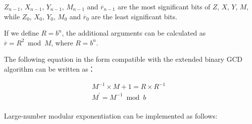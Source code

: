 \documentclass[main\_\_EN.tex]{subfiles}
\begin{document}
\begin{math}Z_{n-1}\end{math},
\begin{math}X_{n-1}\end{math},
\begin{math}Y_{n-1}\end{math},
\begin{math}M_{n-1}\end{math} and
\begin{math}\overline{r}_{n-1}\end{math} are the most significant bits of
\begin{math}Z\end{math},
\begin{math}X\end{math},
\begin{math}Y\end{math},
\begin{math}M\end{math}, while
\begin{math}Z_{0}\end{math},
\begin{math}X_{0}\end{math},
\begin{math}Y_{0}\end{math},
\begin{math}M_{0}\end{math} and
\begin{math}\overline{r}_{0}\end{math} are the least significant bits.

If we define \begin{math}R = b^{n}\end{math}, the additional arguments can be calculated as \begin{math}\overline{r} = R^{2} \bmod M\end{math}, where \begin{math}R = b^{n}\end{math}.

The following equation in the form compatible with the extended binary GCD algorithm can be written as：

\begin{gather*}
        M^{-1} \times M + 1 = R \times R^{-1} \\
        M^{\prime} = M^{-1} \bmod b\\
\end{gather*}

Large-number modular exponentiation can be implemented as follows:
\end{document}
